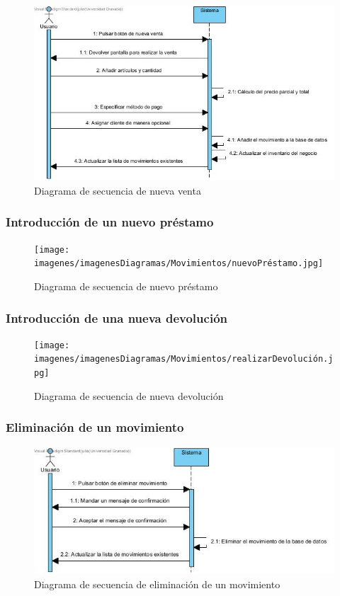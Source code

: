 \begin{figure}[H]
	\centering
	\includegraphics[width=1\textwidth]{imagenes/imagenesDiagramas/Movimientos/nuevaVenta.jpg}
	\caption{Diagrama de secuencia de nueva venta}
	\label{fig:seqdiag19}
\end{figure}

\subsubsection{Introducción de un nuevo préstamo}

\begin{figure}[H]
	\centering
	\texttt{[image: imagenes/imagenesDiagramas/Movimientos/nuevoPréstamo.jpg]}
	\caption{Diagrama de secuencia de nuevo préstamo}
	\label{fig:seqdiag20}
\end{figure}

\subsubsection{Introducción de una nueva devolución}

\begin{figure}[H]
	\centering
	\texttt{[image: imagenes/imagenesDiagramas/Movimientos/realizarDevolución.jpg]}
	\caption{Diagrama de secuencia de nueva devolución}
	\label{fig:seqdiag21}
\end{figure}

\subsubsection{Eliminación de un movimiento}

\begin{figure}[H]
	\centering
	\includegraphics[width=1\textwidth]{imagenes/imagenesDiagramas/Movimientos/eliminarMovimiento.jpg}
	\caption{Diagrama de secuencia de eliminación de un movimiento}
	\label{fig:seqdiag22}
\end{figure}

